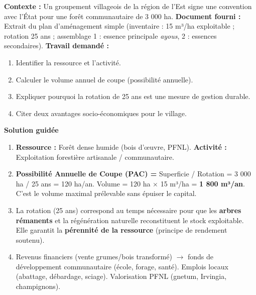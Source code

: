 \documentclass[11pt]{article}
\begin{document}
\begin{experience}
\textbf{Contexte :} Un groupement villageois de la région de l'Est signe une convention avec l'État pour une forêt communautaire de 3 000 ha.
\textbf{Document fourni :} Extrait du plan d'aménagement simple (inventaire : 15 m³/ha exploitable ; rotation 25 ans ; assemblage 1 : essence principale \emph{ayous}, 2 : essences secondaires).
\textbf{Travail demandé :}
\begin{enumerate}
    \item Identifier la ressource et l'activité.
    \item Calculer le volume annuel de coupe (possibilité annuelle).
    \item Expliquer pourquoi la rotation de 25 ans est une mesure de gestion durable.
    \item Citer deux avantages socio-économiques pour le village.
\end{enumerate}
\begin{center}
\textbf{Solution guidée}
\end{center}
\begin{enumerate}
    \item \textbf{Ressource :} Forêt dense humide (bois d'œuvre, PFNL). \textbf{Activité :} Exploitation forestière artisanale / communautaire.
    \item \textbf{Possibilité Annuelle de Coupe (PAC) =} Superficie / Rotation = 3 000 ha / 25 ans = 120 ha/an. Volume = 120 ha $\times$ 15 m³/ha = \textbf{1 800 m³/an}. C'est le volume maximal prélevable sans épuiser le capital.
    \item La rotation (25 ans) correspond au temps nécessaire pour que les \textbf{arbres rémanents} et la régénération naturelle reconstituent le stock exploitable. Elle garantit la \textbf{pérennité de la ressource} (principe de rendement soutenu).
    \item Revenus financiers (vente grumes/bois transformé) $\rightarrow$ fonds de développement communautaire (école, forage, santé). Emplois locaux (abattage, débardage, sciage). Valorisation PFNL (gnetum, Irvingia, champignons).
\end{enumerate}
\end{experience}
\end{document}
